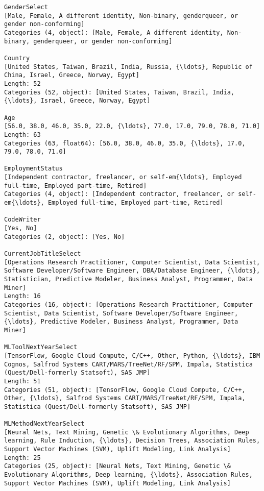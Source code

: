 \documentclass[11pt]{article}
\begin{document}
    \begin{Verbatim}[commandchars=\\\{\}]
GenderSelect
[Male, Female, A different identity, Non-binary, genderqueer, or gender non-conforming]
Categories (4, object): [Male, Female, A different identity, Non-binary, genderqueer, or gender non-conforming]

Country
[United States, Taiwan, Brazil, India, Russia, {\ldots}, Republic of China, Israel, Greece, Norway, Egypt]
Length: 52
Categories (52, object): [United States, Taiwan, Brazil, India, {\ldots}, Israel, Greece, Norway, Egypt]

Age
[56.0, 38.0, 46.0, 35.0, 22.0, {\ldots}, 77.0, 17.0, 79.0, 78.0, 71.0]
Length: 63
Categories (63, float64): [56.0, 38.0, 46.0, 35.0, {\ldots}, 17.0, 79.0, 78.0, 71.0]

EmploymentStatus
[Independent contractor, freelancer, or self-em{\ldots}, Employed full-time, Employed part-time, Retired]
Categories (4, object): [Independent contractor, freelancer, or self-em{\ldots}, Employed full-time, Employed part-time, Retired]

CodeWriter
[Yes, No]
Categories (2, object): [Yes, No]

CurrentJobTitleSelect
[Operations Research Practitioner, Computer Scientist, Data Scientist, Software Developer/Software Engineer, DBA/Database Engineer, {\ldots}, Statistician, Predictive Modeler, Business Analyst, Programmer, Data Miner]
Length: 16
Categories (16, object): [Operations Research Practitioner, Computer Scientist, Data Scientist, Software Developer/Software Engineer, {\ldots}, Predictive Modeler, Business Analyst, Programmer, Data Miner]

MLToolNextYearSelect
[TensorFlow, Google Cloud Compute, C/C++, Other, Python, {\ldots}, IBM Cognos, Salfrod Systems CART/MARS/TreeNet/RF/SPM, Impala, Statistica (Quest/Dell-formerly Statsoft), SAS JMP]
Length: 51
Categories (51, object): [TensorFlow, Google Cloud Compute, C/C++, Other, {\ldots}, Salfrod Systems CART/MARS/TreeNet/RF/SPM, Impala, Statistica (Quest/Dell-formerly Statsoft), SAS JMP]

MLMethodNextYearSelect
[Neural Nets, Text Mining, Genetic \& Evolutionary Algorithms, Deep learning, Rule Induction, {\ldots}, Decision Trees, Association Rules, Support Vector Machines (SVM), Uplift Modeling, Link Analysis]
Length: 25
Categories (25, object): [Neural Nets, Text Mining, Genetic \& Evolutionary Algorithms, Deep learning, {\ldots}, Association Rules, Support Vector Machines (SVM), Uplift Modeling, Link Analysis]


\end{Verbatim}
\end{document}
